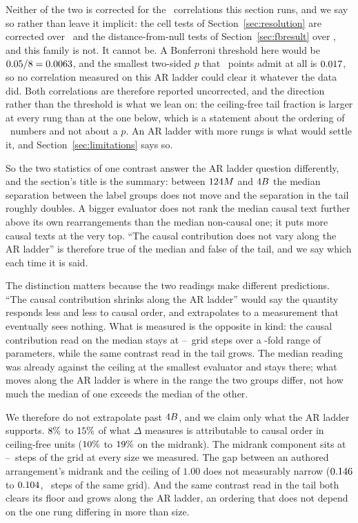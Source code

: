 Neither of the two is corrected for the \TrendNTested\ correlations this
section runs, and we say so rather than leave it implicit: the cell tests of
Section~\ref{sec:resolution} are corrected over \TailNCells\ and the
distance-from-null tests of Section~\ref{sec:fbresult} over
\FbNTestsDisp, and this family is not.  It cannot be.  A Bonferroni
threshold here would be $0.05/8 = 0.0063$, and the
smallest two-sided $p$ that \TrendNEval\ points admit at all is
$0.017$, so no correlation measured on this AR ladder could clear it
whatever the data did.  Both correlations are therefore reported
uncorrected, and the direction rather than the threshold is what we lean
on: the ceiling-free tail fraction is larger at every rung than at the one
below, which is a statement about the ordering of \TrendNEval\ numbers and
not about a $p$.  An AR ladder with more rungs is what would settle it, and
Section~\ref{sec:limitations} says so.

So the two statistics of one contrast answer the AR ladder question
differently, and the section's title is the summary: between
$124M$ and $4B$ the median separation between the label
groups does not move and the separation in the tail roughly doubles.  A
bigger evaluator does not rank the median causal text further above its own
rearrangements than the median non-causal one; it puts more causal texts at
the very top.  ``The causal contribution does not vary along the AR ladder''
is therefore true of the median and false of the tail, and we say which
each time it is said.

The distinction matters because the two readings make different predictions.
``The causal contribution shrinks along the AR ladder'' would say the quantity
responds less and less to causal order, and extrapolates to a measurement
that eventually sees nothing.  What is measured is the opposite in kind: the
causal contribution read on the median stays at
\CausalCompStepsMin--\CausalCompStepsMax\ grid steps
over a \TrendCapSpan-fold range of parameters, while the same contrast
read in
the tail grows.  The median reading was already against the ceiling at the
smallest evaluator and stays there; what moves along the AR ladder is
where in the range the two groups differ, not how much the median of one
exceeds the median of the other.

We therefore do not extrapolate past $4B$, and we claim only what
the AR ladder supports.  $8\%$ to $15\%$ of what $\Delta$
measures is attributable to causal order in ceiling-free units
($10\%$ to $19\%$ on the midrank).  The midrank
component sits at \CausalCompStepsMin--\CausalCompStepsMax\ steps of the
grid at every size we measured.  The gap between an authored arrangement's midrank
and the ceiling of $1.00$ does not measurably narrow ($0.146$ to
$0.104$, \AuthoredCompSpanSteps\ steps of the same grid).  And the same contrast read
in the tail both clears its floor and grows along the AR ladder, an ordering
that does not depend on the one rung differing in more than size.
